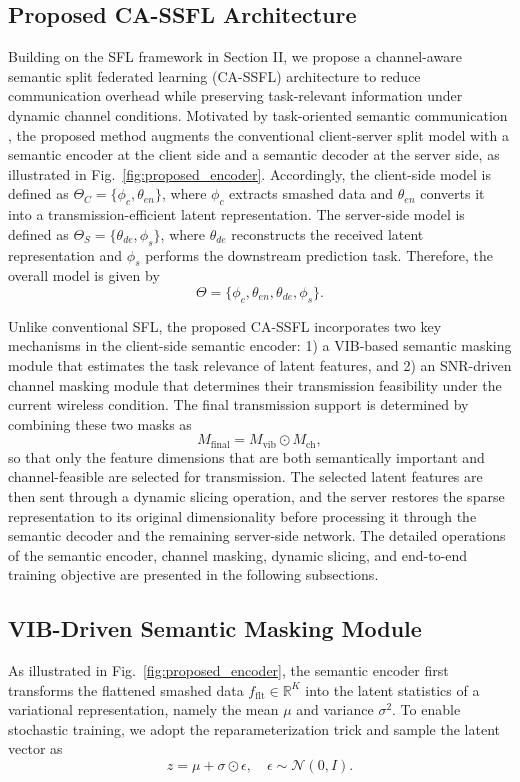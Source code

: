 \subsection{Proposed CA-SSFL Architecture}
Building on the SFL framework in Section II, we propose a channel-aware semantic split federated learning (CA-SSFL) architecture to reduce communication overhead while preserving task-relevant information under dynamic channel conditions. Motivated by task-oriented semantic communication \cite{qin2021semantic,gunduz2022beyond}, the proposed method augments the conventional client-server split model with a semantic encoder at the client side and a semantic decoder at the server side, as illustrated in Fig.~\ref{fig:proposed_encoder}. Accordingly, the client-side model is defined as $\Theta_C = \{\phi_c, \theta_{en}\}$, where $\phi_c$ extracts smashed data and $\theta_{en}$ converts it into a transmission-efficient latent representation. The server-side model is defined as $\Theta_S = \{\theta_{de}, \phi_s\}$, where $\theta_{de}$ reconstructs the received latent representation and $\phi_s$ performs the downstream prediction task. Therefore, the overall model is given by
\begin{equation}
\Theta = \{\phi_c, \theta_{en}, \theta_{de}, \phi_s\}.
\end{equation}

Unlike conventional SFL, the proposed CA-SSFL incorporates two key mechanisms in the client-side semantic encoder: 1) a VIB-based semantic masking module that estimates the task relevance of latent features, and 2) an SNR-driven channel masking module that determines their transmission feasibility under the current wireless condition. The final transmission support is determined by combining these two masks as
\begin{equation}
M_{\mathrm{final}} = M_{\mathrm{vib}} \odot M_{\mathrm{ch}},
\end{equation}
so that only the feature dimensions that are both semantically important and channel-feasible are selected for transmission. The selected latent features are then sent through a dynamic slicing operation, and the server restores the sparse representation to its original dimensionality before processing it through the semantic decoder and the remaining server-side network. The detailed operations of the semantic encoder, channel masking, dynamic slicing, and end-to-end training objective are presented in the following subsections.

\subsection{VIB-Driven Semantic Masking Module}
As illustrated in Fig.~\ref{fig:proposed_encoder}, the semantic encoder first transforms the flattened smashed data $f_{\mathrm{flt}} \in \mathbb{R}^{K}$ into the latent statistics of a variational representation, namely the mean $\mu$ and variance $\sigma^2$. To enable stochastic training, we adopt the reparameterization trick \cite{kingma2013auto} and sample the latent vector as
\begin{equation}
z = \mu + \sigma \odot \epsilon, \quad \epsilon \sim \mathcal{N}(0, I).
\end{equation}

